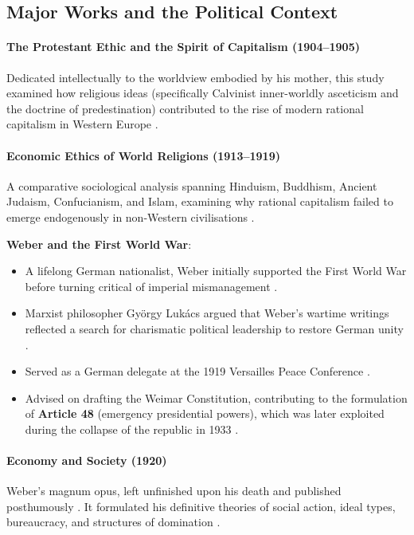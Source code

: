 \subsection{Major Works and the Political Context}

\paragraph{The Protestant Ethic and the Spirit of Capitalism (1904--1905)}
Dedicated intellectually to the worldview embodied by his mother, this study examined how religious ideas (specifically Calvinist inner-worldly asceticism and the doctrine of predestination) contributed to the rise of modern rational capitalism in Western Europe .

\paragraph{Economic Ethics of World Religions (1913--1919)}
A comparative sociological analysis spanning Hinduism, Buddhism, Ancient Judaism, Confucianism, and Islam, examining why rational capitalism failed to emerge endogenously in non-Western civilisations .

\begin{CriticalPoint}
\textbf{Weber and the First World War}:
\begin{itemize}
    \item A lifelong German nationalist, Weber initially supported the First World War before turning critical of imperial mismanagement .
    \item Marxist philosopher Gy\"orgy Luk\'acs argued that Weber's wartime writings reflected a search for charismatic political leadership to restore German unity .
\end{itemize}
\end{CriticalPoint}

\begin{DataFact}
\begin{itemize}
    \item Served as a German delegate at the 1919 Versailles Peace Conference .
    \item Advised on drafting the Weimar Constitution, contributing to the formulation of \textbf{Article 48} (emergency presidential powers), which was later exploited during the collapse of the republic in 1933 .
\end{itemize}
\end{DataFact}

\paragraph{Economy and Society (1920)}
Weber's magnum opus, left unfinished upon his death and published posthumously . It formulated his definitive theories of social action, ideal types, bureaucracy, and structures of domination .

